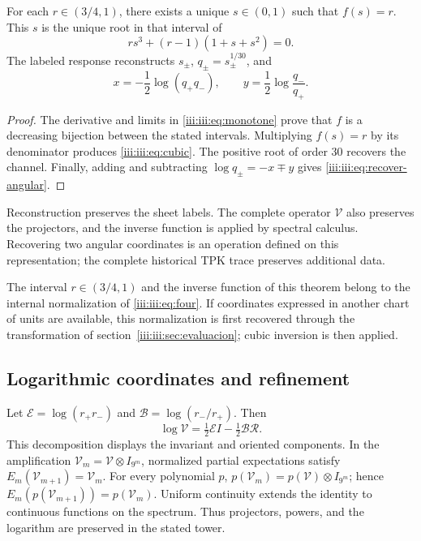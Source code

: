 \begin{theorem}
For each $r\in(3/4,1)$, there exists a unique $s\in(0,1)$ such that $f(s)=r$.
This $s$ is the unique root in that interval of
\begin{equation}
 r s^3+(r-1)(1+s+s^2)=0.
 \label{iii:iii:eq:cubic}
\end{equation}
The labeled response reconstructs $s_\pm$, $q_\pm=s_\pm^{1/30}$, and
\begin{equation}
 x=-\frac12\log(q_+q_-),\qquad
 y=\frac12\log\frac{q_-}{q_+}.
 \label{iii:iii:eq:recover-angular}
\end{equation}
\end{theorem}
\begin{proof}
The derivative and limits in \eqref{iii:iii:eq:monotone} prove that $f$ is a
decreasing bijection between the stated intervals. Multiplying $f(s)=r$
by its denominator produces \eqref{iii:iii:eq:cubic}. The positive root of order
$30$ recovers the channel. Finally, adding and subtracting
$\log q_\pm=-x\mp y$ gives \eqref{iii:iii:eq:recover-angular}.
\end{proof}

Reconstruction preserves the sheet labels. The complete operator
$\mathcal V$ also preserves the projectors, and the inverse function is applied
by spectral calculus. Recovering two angular coordinates is an
operation defined on this representation; the complete historical
TPK trace preserves additional data.

The interval $r\in(3/4,1)$ and the inverse function of this theorem belong
to the internal normalization of \eqref{iii:iii:eq:four}. If coordinates
expressed in another chart of units are available, this normalization
is first recovered through the transformation of
section~\ref{iii:iii:sec:evaluacion}; cubic inversion is then applied.

\subsection{Logarithmic coordinates and refinement}

Let $\mathcal E=\log(r_+r_-)$ and $\mathcal B=\log(r_-/r_+)$. Then
\begin{equation}
 \log\mathcal V=\tfrac12\mathcal E I-\tfrac12\mathcal B\mathcal R.
 \label{iii:iii:eq:logvac}
\end{equation}
This decomposition displays the invariant and oriented components.
In the amplification $\mathcal V_m=\mathcal V\otimes I_{9^m}$, normalized
partial expectations satisfy
$E_m(\mathcal V_{m+1})=\mathcal V_m$. For every polynomial $p$,
$p(\mathcal V_m)=p(\mathcal V)\otimes I_{9^m}$; hence
$E_m(p(\mathcal V_{m+1}))=p(\mathcal V_m)$. Uniform continuity
extends the identity to continuous functions on the spectrum.
Thus projectors, powers, and the logarithm are preserved in the stated tower.

